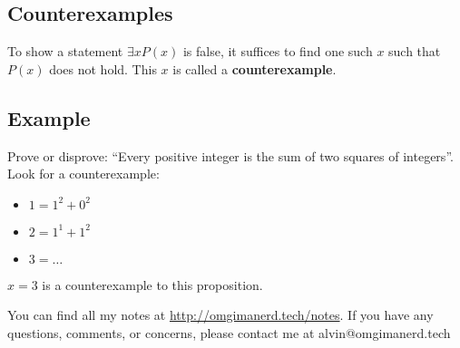 \documentclass{math}
\begin{document}
\subsection*{Counterexamples}
To show a statement \( \exists{x}P(x) \) is false, it suffices to find one such
\( x \) such that \( P(x) \) does not hold. This \( x \) is called a
\textbf{counterexample}.

\subsection*{Example}
Prove or disprove: ``Every positive integer is the sum of two squares of
integers''. Look for a counterexample:
\begin{itemize}
  \item \( 1 = 1^{2}+0^{2} \)
  \item \( 2 = 1^{1}+1^{2} \)
  \item \( 3 = \dots \)
\end{itemize}
\( x = 3 \) is a counterexample to this proposition.

\begin{center}
  You can find all my notes at \url{http://omgimanerd.tech/notes}. If you have
  any questions, comments, or concerns, please contact me at
  alvin@omgimanerd.tech
\end{center}
\end{document}
